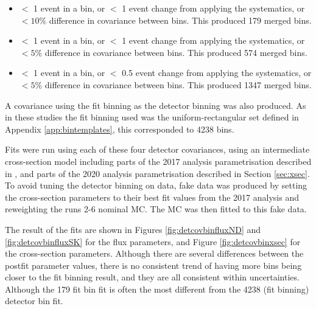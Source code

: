 \begin{itemize}

\item $<$ 1 event in a bin, or $<$ 1 event change from applying the systematics, or $< 10\%$ difference in covariance between bins. This produced 179 merged bins.

\item $<$ 1 event in a bin, or $<$ 1 event change from applying the systematics, or $< 5\%$ difference in covariance between bins. This produced 574 merged bins.

\item $<$ 1 event in a bin, or $<$ 0.5 event change from applying the systematics, or $< 5\%$ difference in covariance between bins. This produced 1347 merged bins.

\end{itemize}

A covariance using the fit binning as the detector binning was also produced. As in these studies the fit binning used was the uniform-rectangular set defined in Appendix \ref{app:bintemplates}, this corresponded to 4238 bins.

Fits were run using each of these four detector covariances, using an intermediate cross-section model including parts of the 2017 analysis parametrisation described in \cite{tn315}, and parts of the 2020 analysis parametrisation described in Section \ref{sec:xsec}. To avoid tuning the detector binning on data, fake data was produced by setting the cross-section parameters to their best fit values from the 2017 analysis and reweighting the runs 2-6 nominal MC. The MC was then fitted to this fake data.

The result of the fits are shown in Figures \ref{fig:detcovbinfluxND} and \ref{fig:detcovbinfluxSK} for the flux parameters, and Figure \ref{fig:detcovbinxsec} for the cross-section parameters. Although there are several differences between the postfit parameter values, there is no consistent trend of having more bins being closer to the fit binning result, and they are all consistent within uncertainties. Although the 179 fit bin fit is often the most different from the 4238 (fit binning) detector bin fit.

